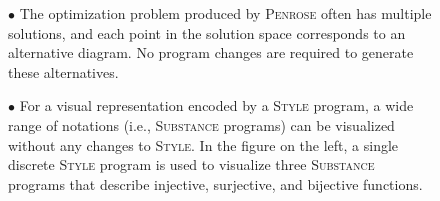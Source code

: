 \documentclass[12pt]{cmuthesis}
\makeatletter
\newcommand*{\ie}{i.e.\@\xspace}
\newcommand*{\Penrose}{\textsc{Penrose}\xspace}
\newcommand*{\Substance}{\textsc{Substance}\xspace}
\newcommand*{\Style}{\textsc{Style}\xspace}
\makeatother
\begin{document}

\vspace{1em}
\begin{figure}[h]
\begin{minipage}[b]{0.48\linewidth}
$\bullet$ The optimization problem produced by \Penrose often has multiple solutions, and each point in the solution space corresponds to an alternative diagram. No program changes are required to generate these alternatives.
    \vspace{3pt}

$\bullet$ For a visual representation encoded by a \Style program, a wide range of notations (\ie, \Substance programs) can be visualized without any changes to \Style. In the figure on the left, a single discrete \Style program is used to visualize three \Substance programs that describe injective, surjective, and bijective functions.
    \vspace{3pt}


\end{minipage}
\end{figure}
\end{document}
